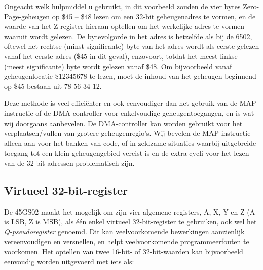 Ongeacht welk hulpmiddel u gebruikt, in dit voorbeeld zouden de vier bytes Zero-Page-geheugen op \$45 -- \$48 lezen om een 32-bit geheugenadres te vormen, en de waarde van het Z-register hieraan optellen om het werkelijke adres te vormen waaruit wordt gelezen. De bytevolgorde in het adres is hetzelfde als bij de 6502, oftewel het rechtse (minst significante) byte van het adres wordt als eerste gelezen vanaf het eerste adres (\$45 in dit geval), enzovoort, totdat het meest linkse (meest significante) byte wordt gelezen vanaf \$48. Om bijvoorbeeld vanaf geheugenlocatie \$12345678 te lezen, moet de inhoud van het geheugen beginnend op \$45 bestaan uit 78 56 34 12.

Deze methode is veel efficiënter en ook eenvoudiger dan het gebruik van de MAP-instructie of de DMA-controller voor enkelvoudige geheugentoegangen, en is wat wij doorgaans aanbevelen. De DMA-controller kan worden gebruikt voor het verplaatsen/vullen van grotere geheugenregio's. Wij bevelen de MAP-instructie alleen aan voor het banken van code, of in zeldzame situaties waarbij uitgebreide toegang tot een klein geheugengebied vereist is en de extra cycli voor het lezen van de 32-bit-adressen problematisch zijn.

\subsection{Virtueel 32-bit-register}

De 45GS02 maakt het mogelijk om zijn vier algemene registers, A, X, Y en Z (A is LSB, Z is MSB), als één enkel virtueel 32-bit-register te gebruiken, ook wel het {\em Q-pseudoregister} genoemd. Dit kan veelvoorkomende bewerkingen aanzienlijk vereenvoudigen en versnellen, en helpt veelvoorkomende programmeerfouten te voorkomen. Het optellen van twee 16-bit- of 32-bit-waarden kan bijvoorbeeld eenvoudig worden uitgevoerd met iets als:


